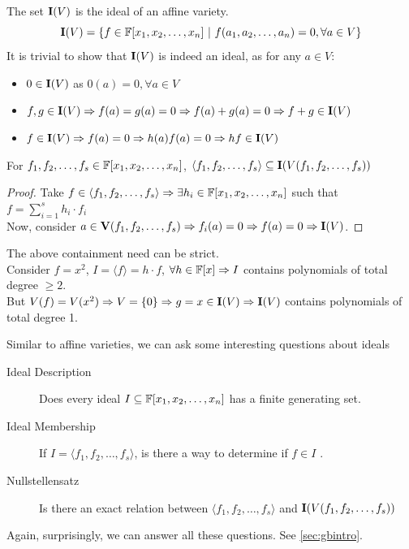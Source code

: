 \documentclass[a4paper,11pt]{article}
\begin{document}
\begin{defn}
    The set $\textbf{I}(V)$ is the ideal of an affine variety.
    \begin{equation}
        \textbf{I}(V) =\{f\in\mathbb{F}[x_1, x_2, \ldots, x_n] \ |\ f(a_1, a_2, \ldots, a_n)=0, \forall a\in V\}
    \end{equation}
    It is trivial to show that $\textbf{I}(V)$ is indeed an ideal, as for any $a\in V$:
    \begin{itemize}
        \item $0 \in \textbf{I}(V)$ as $0(a) = 0, \forall a \in V$
        \item $f,g \in \textbf{I}(V) \Rightarrow f(a) = g(a) = 0 \Rightarrow f(a)+g(a)=0 \Rightarrow f+g \in \textbf{I}(V)$
        \item $f \in \textbf{I}(V) \Rightarrow f(a) = 0 \Rightarrow h(a)f(a)=0 \Rightarrow hf \in \textbf{I}(V)$
    \end{itemize}
\end{defn}
\begin{lem}
    For $f_1,f_2,\ldots,f_s\in \mathbb{F}[x_1, x_2, \ldots, x_n]$, $\langle f_1,f_2,\ldots,f_s\rangle\subseteq\textbf{I}(V(f_1,f_2,\ldots,f_s))$
\end{lem}
\vspace{-1em}
\begin{proof}
    Take $f\in\langle f_1,f_2,\ldots,f_s\rangle\Rightarrow \exists h_i\in\mathbb{F}[x_1, x_2, \ldots, x_n]$ such that $f =\sum_{i=1}^{s}h_{i}\cdot f_{i}$\\
    Now, consider $a\in \textbf{V}(f_1,f_2,\ldots,f_{s})\Rightarrow f_i(a)=0 \Rightarrow f(a)=0 \Rightarrow \textbf{I}(V)$.
\end{proof}
\begin{note}
    The above containment need can be strict.\\
    Consider $f = x^2$,
    $I=\langle f\rangle=h\cdot f$,  $\forall h \in \mathbb{F}[x] \Rightarrow I$ contains polynomials of total degree $\geq 2$.\\
    But $V(f) = V(x^2)\Rightarrow V = \{0\} \Rightarrow g=x \in \textbf{I}(V) \Rightarrow \textbf{I}(V)$ contains polynomials of total degree 1.
\end{note}
Similar to affine varieties, we can ask some interesting questions about ideals
\begin{description}
    \item[Ideal Description] Does every ideal $I\subseteq\mathbb{F}[x_1, x_2, \ldots, x_n]$ has a finite generating set.
    \item[Ideal Membership] If $I=\langle f_1,f_2,\ldots,f_s\rangle$, is there a way to determine if $f\in I$ .
    \item[Nullstellensatz] Is there an exact relation between $\langle f_1,f_2,\ldots,f_s\rangle$ and $\textbf{I}(V(f_1,f_2,\ldots,f_s))$
\end{description}
Again, surprisingly, we can answer all these questions. See \ref{sec:gbintro}.
\end{document}

